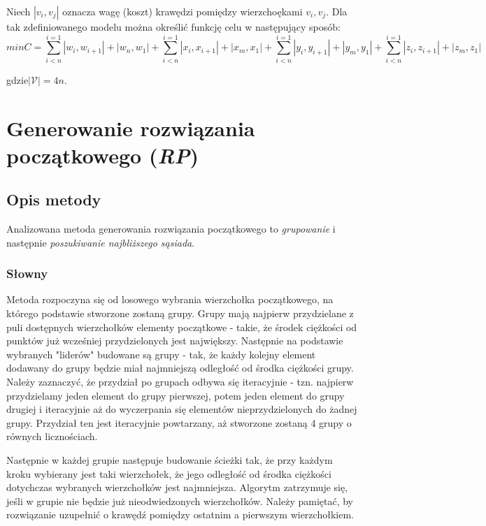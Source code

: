\documentclass{article}
\begin{document}
Niech $|{v_i, v_j}|$ oznacza wagę (koszt) krawędzi pomiędzy wierzchoękami $v_i, v_j$. Dla tak zdefiniowanego modelu można określić funkcję celu w następujący sposób:
\begin{equation}
minC=\sum \limits_{i<n}^{i=1} |w_i,w_{i+1}| + |w_n,w_1| + \sum \limits_{i<n}^{i=1} |x_i,x_{i+1}| + |x_m,x_1| + \sum \limits_{i<n}^{i=1} |y_i,y_{i+1}| + |y_m,y_1| + \sum \limits_{i<n}^{i=1} |z_i,z_{i+1}| + |z_m,z_1|
\end{equation}

gdzie$|\mathcal{V}| = 4n$.

\section{Generowanie rozwiązania początkowego (\emph{RP})}
\subsection{Opis metody}
Analizowana metoda generowania rozwiązania początkowego to \emph{grupowanie} i następnie \emph{poszukiwanie najbliższego sąsiada}.

\subsubsection{Słowny} \label{sec:slownyrp}
Metoda rozpoczyna się od losowego wybrania wierzchołka początkowego, na którego podstawie stworzone zostaną grupy. Grupy mają najpierw przydzielane z puli dostępnych wierzchołków elementy początkowe - takie, że środek ciężkości od punktów już wcześniej przydzielonych jest największy. Następnie na podstawie wybranych "liderów" budowane są grupy - tak, że każdy kolejny element dodawany do grupy będzie miał najmniejszą odległość od środka ciężkości grupy. Należy zaznaczyć, że przydział po grupach odbywa się iteracyjnie - tzn. najpierw przydzielamy jeden element do grupy pierwszej, potem jeden element do grupy drugiej i iteracyjnie aż do wyczerpania się elementów nieprzydzielonych do żadnej grupy. Przydział ten jest iteracyjnie powtarzany, aż stworzone zostaną 4 grupy o równych licznościach.

Następnie w każdej grupie następuje budowanie ścieżki tak, że przy każdym kroku wybierany jest taki wierzchołek, że jego odległość od środka ciężkości dotychczas wybranych wierzchołków jest najmniejsza. Algorytm zatrzymuje się, jeśli w grupie nie będzie już nieodwiedzonych wierzchołków. Należy pamiętać, by rozwiązanie uzupełnić o krawędź pomiędzy ostatnim a pierwszym wierzchołkiem.
\end{document}
